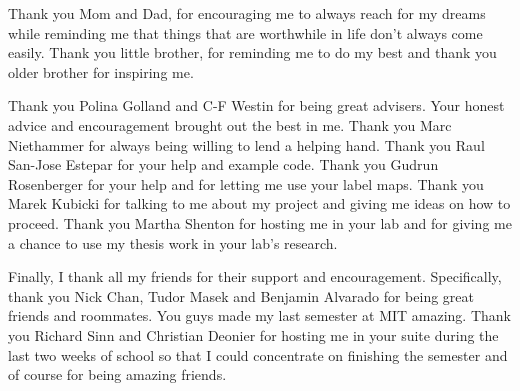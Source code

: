 Thank you Mom and Dad, for encouraging me to always reach for my dreams while reminding me that things that are worthwhile in life don't always come easily.  Thank you little brother, for reminding me to do my best and thank you older brother for inspiring me.

Thank you Polina Golland and C-F Westin for being great advisers.  Your honest advice and encouragement brought out the best in me.  Thank you Marc Niethammer for always being willing to lend a helping hand.  Thank you Raul San-Jose Estepar for your help and example code.  Thank you Gudrun Rosenberger for your help and for letting me use your label maps.  Thank you Marek Kubicki for talking to me about my project and giving me ideas on how to proceed. Thank you Martha Shenton for hosting me in your lab and for giving me a chance to use my thesis work in your lab's research.

Finally, I thank all my friends for their support and encouragement.  Specifically, thank you Nick Chan, Tudor Masek and Benjamin Alvarado for being great friends and roommates.  You guys made my last semester at MIT amazing.  Thank you Richard Sinn and Christian Deonier for hosting me in your suite during the last two weeks of school so that I could concentrate on finishing the semester and of course for being amazing friends.



